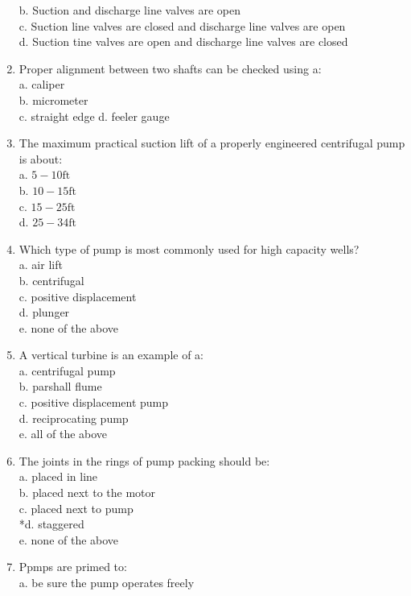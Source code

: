 \begin{enumerate}[1.]
b. Suction and discharge line valves are open\\
c. Suction line valves are closed and discharge line valves are open\\
d. Suction tine valves are open and discharge line valves are closed\\
\item Proper alignment between two shafts can be checked using a:\\
a. caliper\\
b. micrometer\\
c. straight edge d. feeler gauge\\
\item The maximum practical suction lift of a properly engineered centrifugal pump is about:\\
a. $5-10 \mathrm{ft}$\\
b. $10-15 \mathrm{ft}$\\
c. $15-25 \mathrm{ft}$\\
d. $25-34 \mathrm{ft}$\\
\item Which type of pump is most commonly used for high capacity wells?\\
a. air lift\\
b. centrifugal\\
c. positive displacement\\
d. plunger\\
e. none of the above\\
\item A vertical turbine is an example of a:\\
a. centrifugal pump\\
b. parshall flume\\
c. positive displacement pump\\
d. reciprocating pump\\
e. all of the above\\
\item The joints in the rings of pump packing should be:\\
a. placed in line\\
b. placed next to the motor\\
c. placed next to pump\\
*d. staggered\\
e. none of the above\\
\item Ppmps are primed to:\\
a. be sure the pump operates freely\\

\end{enumerate}
